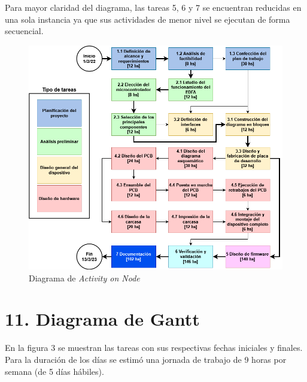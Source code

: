 \documentclass[
11pt, %
codirector, %
]{charter}
\begin{document}
Para mayor claridad del diagrama, las tareas 5, 6 y 7 se encuentran reducidas en una sola instancia ya que sus actividades de menor nivel se ejecutan de forma secuencial.

\begin{figure}[H]
\centering 
\includegraphics[width=.9\textwidth]{./Figuras/AoN.png}
\caption{Diagrama de \textit{Activity on Node}}
\label{fig:AoN}
\end{figure}

\section{11. Diagrama de Gantt}
\label{sec:gantt}

En la figura 3 se muestran las tareas con sus respectivas fechas iniciales y finales. Para la duración de los días se estimó una jornada de trabajo de 9 horas por semana (de 5 días hábiles).
\end{document}
